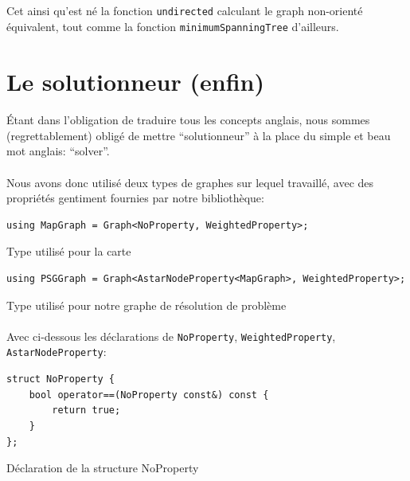 \documentclass[french]{article}
\begin{document}
Cet ainsi qu'est né la fonction \texttt{undirected} calculant le graph
non-orienté équivalent, tout comme la fonction \texttt{minimumSpanningTree}
d'ailleurs.

\section{Le solutionneur (enfin)}

\paragraph{} Étant dans l'obligation de traduire tous les concepts anglais,
nous sommes (regrettablement) obligé de mettre ``solutionneur'' à la place du
simple et beau mot anglais: ``solver''.

\paragraph{} Nous avons donc utilisé deux types de graphes sur lequel
travaillé, avec des propriétés gentiment fournies par notre bibliothèque:

\begin{listing}[H]
\begin{verbatim}
using MapGraph = Graph<NoProperty, WeightedProperty>;
\end{verbatim}
\caption{Type utilisé pour la carte}
\label{tsp:map}
\end{listing}

\begin{listing}[H]
\begin{verbatim}
using PSGGraph = Graph<AstarNodeProperty<MapGraph>, WeightedProperty>;
\end{verbatim}
\caption{Type utilisé pour notre graphe de résolution de problème}
\label{tsp:psg}
\end{listing}

\paragraph{} Avec ci-dessous les déclarations de \texttt{NoProperty},
\texttt{WeightedProperty}, \texttt{AstarNodeProperty}:

\begin{listing}[H]
\begin{verbatim}
struct NoProperty {
	bool operator==(NoProperty const&) const {
		return true;
	}
};
\end{verbatim}
\caption{Déclaration de la structure NoProperty}
\label{tsp:noprop}
\end{listing}
\end{document}
